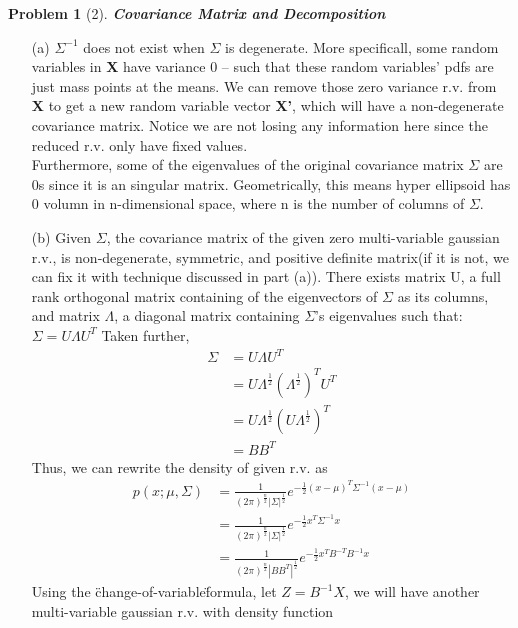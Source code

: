 \documentclass[11pt]{article}
\theoremstyle{quest}
\newtheorem*{question}{Problem}
\begin{document}
\begin{question}[2]
\textbf{Covariance Matrix and Decomposition}
\end{question}
\begin{itemize}
\item[(a)]
$\Sigma^{-1}$ does not exist when $\Sigma$ is degenerate. More specificall, some random variables in \textbf{X} have variance 0 -- such that these random variables' pdfs are just mass points at the means. We can remove those zero variance r.v. from \textbf{X} to get a new random variable vector \textbf{X'}, which will have a non-degenerate covariance matrix. Notice we are not losing any information here since the reduced r.v. only have fixed values.\\
Furthermore, some of the eigenvalues of the original covariance matrix $\Sigma$ are 0s since it is an singular matrix. Geometrically, this means hyper ellipsoid has 0 volumn in n-dimensional space, where n is the number of columns of $\Sigma$.
\item[(b)]
Given $\Sigma$, the covariance matrix of the given zero multi-variable gaussian r.v., is non-degenerate, symmetric, and positive definite matrix(if it is not, we can fix it with technique discussed in part (a)). There exists matrix U, a full rank orthogonal matrix containing of the eigenvectors of $\Sigma$ as its columns, and matrix $\Lambda$, a diagonal matrix containing $\Sigma$'s eigenvalues such that:\\ $\Sigma = U\Lambda U^{T}$
Taken further,
\begin{align*}
\Sigma &= U\Lambda U^{T}\\
       &= U\Lambda^{\frac{1}{2}}(\Lambda^{\frac{1}{2}})^{T}U^{T}\\
       &= U\Lambda^{\frac{1}{2}}(U\Lambda^{\frac{1}{2}})^{T}\\
       &= BB^{T}
\end{align*}
Thus, we can rewrite the density of given r.v. as
\begin{align*}
p(x;\mu,\Sigma) &= \frac{1}{(2\pi)^{\frac{n}{2}}|\Sigma|^{\frac{1}{2}}} e^{-\frac{1}{2}(x-\mu)^{T}\Sigma^{-1}(x-\mu)}\\
&= \frac{1}{(2\pi)^{\frac{n}{2}}|\Sigma|^{\frac{1}{2}}} e^{-\frac{1}{2}x^{T}\Sigma^{-1}x}\\
&= \frac{1}{(2\pi)^{\frac{n}{2}}|BB^{T}|^{\frac{1}{2}}} e^{-\frac{1}{2}x^{T}B^{-T}B^{-1}x}
\end{align*}
Using the \"change-of-variable\" formula, let $Z = B^{-1}X$, we will have another multi-variable gaussian r.v. with density function

\end{itemize}
\end{document}
